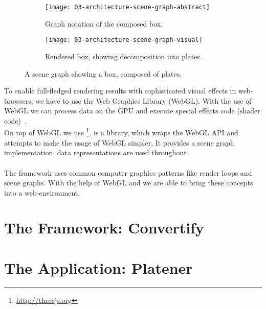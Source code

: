 \documentclass[../ClassicThesis.tex]{subfiles}
\begin{document}
\begin{figure}[H]
  \centering
  \begin{subfigure}[b]{0.49\textwidth}
    \centering
    \texttt{[image: 03-architecture-scene-graph-abstract]}
    \caption{Graph notation of the composed box.}
    \label{fig:scene-graph:abstract}
  \end{subfigure}
  \begin{subfigure}[b]{0.49\textwidth}
    \centering
    \texttt{[image: 03-architecture-scene-graph-visual]}
    \caption{Rendered box, showing decomposition into plates.}
    \label{fig:scene-graph:visual}
  \end{subfigure}
  \caption{A scene graph showing a box, composed of plates.}
  \label{fig:scene-graph}
\end{figure}

To enable full-fledged rendering results with sophisticated visual
effects in web-browsers, we have to use the Web Graphics Library
(WebGL). With the use of WebGL we can process data on the GPU and
execute special effects code (shader code)~\cite{mdn-webgl}.
\\
On top of WebGL we use {\threejs}\footnote{\url{http://threejs.org}}.
{\threejs} is a {\javascript} library, which wraps the WebGL API and
attempts to make the usage of WebGL simpler. It provides a scene graph
implementation. {\threejs}
data representations are used throughout {\convertify}.\\
\\
The framework {\convertify} uses common computer graphics patterns
like render loops and scene graphs. With the help of WebGL and
{\threejs} we are able to bring these concepts into a web-environment.








\section{The Framework: Convertify}
\label{sec:framework-convertify}

\section{The Application: Platener}
\label{sec:application-platener}
\end{document}
